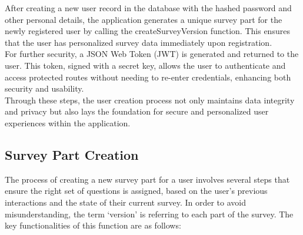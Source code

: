 \noindent After creating a new user record in the database with the hashed password and other personal details, the application generates a unique survey part for the newly registered user by calling the createSurveyVersion function. This ensures that the user has personalized survey data immediately upon registration.\vspace{5mm} \\
For further security, a JSON Web Token (JWT) is generated and returned to the user. This token, signed with a secret key, allows the user to authenticate and access protected routes without needing to re-enter credentials, enhancing both security and usability.\vspace{5mm} \\
Through these steps, the user creation process not only maintains data integrity and privacy but also lays the foundation for secure and personalized user experiences within the application.

\subsection{Survey Part Creation}

The process of creating a new survey part for a user involves several steps that ensure the right set of questions is assigned, based on the user's previous interactions and the state of their current survey. In order to avoid misunderstanding, the term `version' is referring to each part of the survey. The key functionalities of this function are as follows:

